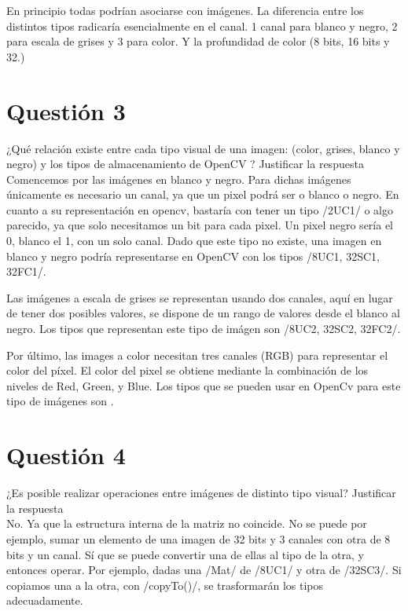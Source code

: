 \documentclass[	DIV=calc,%
							paper=a4,%
							fontsize=11pt]{scrartcl}	 					%
\newcommand{\miit}[1]{{\usefont{T1}{mdugm}{m}{it}\selectfont #1}}
\begin{document}
En principio todas podrían asociarse con imágenes. La diferencia entre los distintos tipos radicaría esencialmente en el canal. 1 canal para blanco y negro, 2 para escala de grises y 3 para color. Y la profundidad de color (8 bits, 16 bits y 32.)

\section{Questión 3}

\miit{¿Qué relación existe entre cada tipo visual de una
imagen: (color, grises, blanco y negro) y los tipos de
almacenamiento de OpenCV ? Justificar la respuesta}\\

Comencemos por las imágenes en blanco y negro. Para dichas imágenes únicamente es necesario un canal, ya que un pixel podrá ser o blanco o negro. En cuanto a su representación en opencv, bastaría con tener un tipo \cppinline/2UC1/ o algo parecido, ya que solo necesitamos un bit para cada pixel. Un pixel negro sería el 0, blanco el 1, con un solo canal. Dado que este tipo no existe, una imagen en blanco y negro podría representarse en OpenCV con los tipos \cppinline/8UC1, 32SC1, 32FC1/.

Las imágenes a escala de grises se representan usando dos canales, aquí en lugar de tener dos posibles valores, se dispone de un rango de valores desde el blanco al negro. Los tipos que representan este tipo de imágen son  \cppinline/8UC2, 32SC2, 32FC2/.

Por último, las images a color necesitan tres canales (RGB) para representar el color del píxel. El color del pixel se obtiene mediante la combinación de los niveles de {\color{red} Red}, {\color{green} Green}, y {\color{blue} Blue}. Los tipos que se pueden usar en OpenCv para este tipo de imágenes son .

\section{Questión 4}

\miit{¿Es posible realizar operaciones entre imágenes de
distinto tipo visual? Justificar la respuesta}\\

No. Ya que la estructura interna de la matriz no coincide. No se puede por ejemplo, sumar un elemento de una imagen de 32 bits y 3 canales con otra de 8 bits y un canal. Sí que se puede convertir una de ellas al tipo de la otra, y entonces operar. Por ejemplo, dadas una \cppinline/Mat/ de \cppinline/8UC1/ y otra de \cppinline/32SC3/. Si copiamos una a la otra, con \cppinline/copyTo()/, se trasformarán los tipos adecuadamente.
\end{document}
